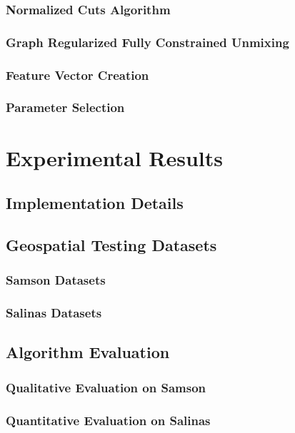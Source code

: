 \documentclass[10pt]{article}
\begin{document}
\subsubsection{Normalized Cuts Algorithm}\label{Algorithm Ncuts}
\subsubsection{Graph Regularized Fully Constrained Unmixing}\label{Algorithm Unmixing}
\subsubsection{Feature Vector Creation}\label{Algorithm FV}
\subsubsection{Parameter Selection}\label{Parameters}

\clearpage
% 
% 
% 
% 
% 
\section{Experimental Results}

\subsection{Implementation Details}

\clearpage
\subsection{Geospatial Testing Datasets}
\subsubsection{Samson Datasets}
\subsubsection{Salinas Datasets}

\clearpage
\subsection{Algorithm Evaluation}
\subsubsection{Qualitative Evaluation on Samson}
\subsubsection{Quantitative Evaluation on Salinas}
\end{document}
